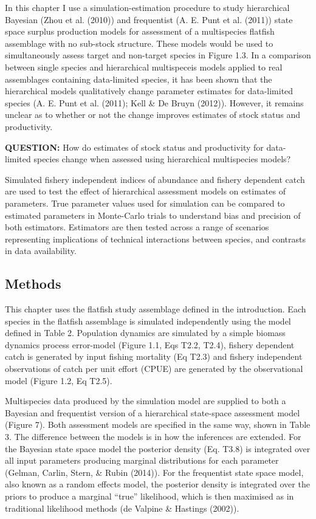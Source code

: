 \documentclass[12pt,]{scrartcl}
\begin{document}
In this chapter I use a simulation-estimation procedure to study
hierarchical Bayesian (Zhou et al. (2010)) and frequentist (A. E. Punt
et al. (2011)) state space surplus production models for assessment of a
multispecies flatfish assemblage with no sub-stock structure. These
models would be used to simultaneously assess target and non-target
species in Figure 1.3. In a comparison between single species and
hierarchical multispeceis models applied to real assemblages containing
data-limited species, it has been shown that the hierarchical models
qualitatively change parameter estimates for data-limited species (A. E.
Punt et al. (2011); Kell \& De Bruyn (2012)). However, it remains
unclear as to whether or not the change improves estimates of stock
status and productivity.

\textbf{QUESTION:} How do estimates of stock status and productivity for
data-limited species change when assessed using hierarchical
multispecies models?

Simulated fishery independent indices of abundance and fishery dependent
catch are used to test the effect of hierarchical assessment models on
estimates of parameters. True parameter values used for simulation can
be compared to estimated parameters in Monte-Carlo trials to understand
bias and precision of both estimators. Estimators are then tested across
a range of scenarios representing implications of technical interactions
between species, and contrasts in data availability.

\subsection{Methods}\label{methods}

This chapter uses the flatfish study assemblage defined in the
introduction. Each species in the flatfish assemblage is simulated
independently using the model defined in Table 2. Population dynamics
are simulated by a simple biomass dynamics process error-model (Figure
1.1, Eqs T2.2, T2.4), fishery dependent catch is generated by input
fishing mortality (Eq T2.3) and fishery independent observations of
catch per unit effort (CPUE) are generated by the observational model
(Figure 1.2, Eq T2.5).

Multispecies data produced by the simulation model are supplied to both
a Bayesian and frequentist version of a hierarchical state-space
assessment model (Figure 7). Both assessment models are specified in the
same way, shown in Table 3. The difference between the models is in how
the inferences are extended. For the Bayesian state space model the
posterior density (Eq. T3.8) is integrated over all input parameters
producing marginal distributions for each parameter (Gelman, Carlin,
Stern, \& Rubin (2014)). For the frequentist state space model, also
known as a random effects model, the posterior density is integrated
over the priors to produce a marginal ``true'' likelihood, which is then
maximised as in traditional likelihood methods (de Valpine \& Hastings
(2002)).
\end{document}
